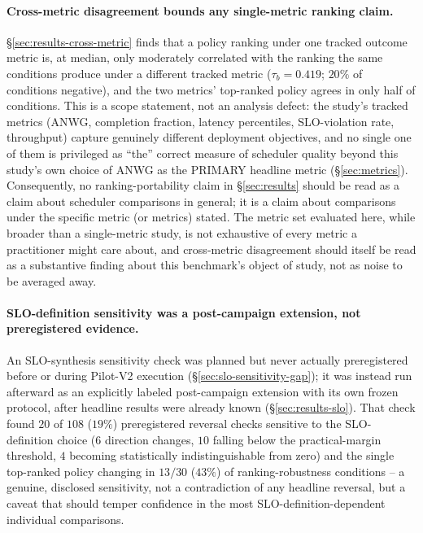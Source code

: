 \documentclass[sn-basic,Numbered,pdflatex]{sn-jnl}
\begin{document}
\paragraph{Cross-metric disagreement bounds any single-metric ranking
claim.} \S\ref{sec:results-cross-metric} finds that a policy ranking under
one tracked outcome metric is, at median, only moderately correlated with
the ranking the same conditions produce under a different tracked metric
($\tau_b = 0.419$; $20\%$ of conditions negative), and the two metrics'
top-ranked policy agrees in only half of conditions. This is a scope
statement, not an analysis defect: the study's tracked metrics (ANWG,
completion fraction, latency percentiles, SLO-violation rate, throughput)
capture genuinely different deployment objectives, and no single one of
them is privileged as ``the'' correct measure of scheduler quality beyond
this study's own choice of ANWG as the PRIMARY headline metric
(\S\ref{sec:metrics}). Consequently, no ranking-portability claim in
\S\ref{sec:results} should be read as a claim about scheduler comparisons
in general; it is a claim about comparisons under the specific metric (or
metrics) stated. The metric set evaluated here, while broader than a
single-metric study, is not exhaustive of every metric a practitioner might
care about, and cross-metric disagreement should itself be read as a
substantive finding about this benchmark's object of study, not as noise to
be averaged away.

\paragraph{SLO-definition sensitivity was a post-campaign extension, not
preregistered evidence.} An SLO-synthesis sensitivity check was planned but
never actually preregistered before or during Pilot-V2 execution
(\S\ref{sec:slo-sensitivity-gap}); it was instead run afterward as an
explicitly labeled post-campaign extension with its own frozen protocol,
after headline results were already known (\S\ref{sec:results-slo}). That
check found $20$ of $108$ ($19\%$) preregistered reversal checks sensitive
to the SLO-definition choice ($6$ direction changes, $10$ falling below the
practical-margin threshold, $4$ becoming statistically indistinguishable
from zero) and the single top-ranked policy changing in $13/30$ ($43\%$)
of ranking-robustness conditions -- a genuine, disclosed sensitivity, not a
contradiction of any headline reversal, but a caveat that should temper
confidence in the most SLO-definition-dependent individual comparisons.
\end{document}
